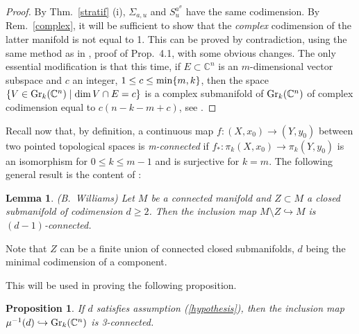 \documentclass[12pt]{amsart}
\newtheorem{prop}[thm]{Proposition}
\newtheorem{lem}[thm]{Lemma}
\theoremstyle{definition}
\theoremstyle{remark}
\newcommand{\CC}{\mathbb C}
\begin{document}
 \begin{proof} %
 By Thm.~\ref{stratif} (i), $\Sigma_{a,u}$ and $S_{u}^{{a}^\sigma}$ have the same codimension.
 By Rem.~\ref{complex}, it will be sufficient to show that the {\it complex} codimension of the latter manifold is not equal to 1. 
 This can be proved by contradiction, using the same method as in \cite{Mare}, proof of Prop.~4.1, with some obvious changes.  The only essential modification is that this time, if $E\subset \CC^n$ is an $m$-dimensional vector subspace
 and $c$ an integer, $1 \le c \le {\rm min} \{m, k\}$, then
 the space $\{V \in {\rm Gr}_k(\CC^n) \mid \dim V \cap E =c\}$ is a complex submanifold of $ {\rm Gr}_k(\CC^n)$ of complex codimension equal to  $c(n-k-m+c)$, see \cite[Thm.~4.1 (c)]{Wo}. 
  \end{proof}
 
 
 
 Recall now that, by definition,  a continuous map $f: (X, x_0)\to (Y, y_0)$ between two pointed topological spaces is {\it m-connected} if
$f_*: \pi_k(X, x_0) \to \pi_k(Y, y_0)$ is an isomorphism for $0\le k \le m-1$ and is surjective for $k=m$. The following general result is the content of \cite[Thm.~1.11]{BW}:

\begin{lem}  \label{cs} {\rm (B.~Williams)} Let $M$ be a connected manifold and $Z\subset M$ a closed submanifold of codimension $d\ge 2$. Then the inclusion map 
$M\setminus Z \hookrightarrow M$ is $(d-1)$-connected.  
\end{lem}

Note that $Z$  can be a finite union of connected closed submanifolds, $d$ being the minimal codimension of a component.  

This will be used in proving the following proposition. 

\begin{prop} \label{key} If $d$ satisfies assumption (\ref{hypothesis}), then the inclusion map
$\mu^{-1}(d) \hookrightarrow  {\rm Gr}_k(\CC^n)$ is 3-connected.
\end{prop} 
\end{document}
